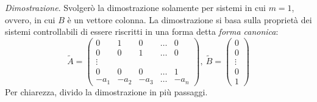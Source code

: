 \emph{Dimostrazione}.
Svolgerò la dimostrazione solamente per sistemi in cui $m = 1$, ovvero,
in cui $B$ è un vettore colonna.
La dimostrazione si basa sulla proprietà dei sistemi controllabili di essere
riscritti in una forma detta \emph{forma canonica}:
\begin{equation}
    \tilde A = \left(
        \begin{array}{ccccc}
            0 &1 &0 &\ldots &0 \\
            0 &0 &1 &\ldots &0 \\
            \vdots & & & & \\
            0 &0 &0 &\ldots &1 \\
            -a_1 &-a_2 &-a_3 &\ldots &-a_n
        \end{array}
    \right),\ \tilde B = \left(
    \begin{array}{c}
        0 \\
        0 \\
        \vdots \\
        0 \\
        1
    \end{array}
    \right)
    \label{eq:forma-canonica}
\end{equation}
Per chiarezza, divido la dimostrazione in più passaggi.
